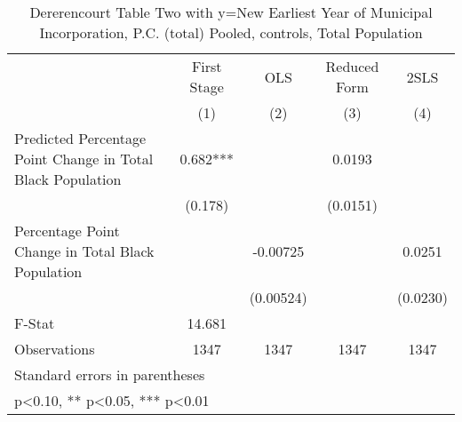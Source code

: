 \begin{table}[htbp]\centering
\def\sym#1{\ifmmode^{#1}\else\(^{#1}\)\fi}
\caption{Dererencourt Table Two with y=New Earliest Year of Municipal Incorporation, P.C. (total)  Pooled,  controls, Total Population}
\begin{tabular}{l*{4}{c}}
\toprule
                    & First Stage   &         OLS   &Reduced Form   &        2SLS   \\
                    &\multicolumn{1}{c}{(1)}   &\multicolumn{1}{c}{(2)}   &\multicolumn{1}{c}{(3)}   &\multicolumn{1}{c}{(4)}   \\
\midrule
Predicted Percentage Point Change in Total Black Population&       0.682***&               &      0.0193   &               \\
                    &     (0.178)   &               &    (0.0151)   &               \\
\addlinespace
Percentage Point Change in Total Black Population&               &    -0.00725   &               &      0.0251   \\
                    &               &   (0.00524)   &               &    (0.0230)   \\
\midrule
F-Stat              &      14.681   &               &               &               \\
Observations        &        1347   &        1347   &        1347   &        1347   \\
\bottomrule
\multicolumn{5}{l}{\footnotesize Standard errors in parentheses}\\
\multicolumn{5}{l}{\footnotesize * p<0.10, ** p<0.05, *** p<0.01}\\
\end{tabular}
\end{table}
